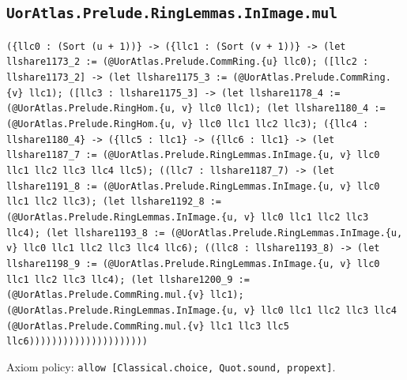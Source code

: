 \documentclass[11pt]{article}
\begin{document}
\subsection*{\texttt{UorAtlas.Prelude.RingLemmas.InImage.mul}}
\noindent\texttt{(\{llc0 : (Sort (u + 1))\} -> (\{llc1 : (Sort (v + 1))\} -> (let llshare1173\_2 := (@UorAtlas.Prelude.CommRing.\{u\} llc0); ([llc2 : llshare1173\_2] -> (let llshare1175\_3 := (@UorAtlas.Prelude.CommRing.\{v\} llc1); ([llc3 : llshare1175\_3] -> (let llshare1178\_4 := (@UorAtlas.Prelude.RingHom.\{u, v\} llc0 llc1); (let llshare1180\_4 := (@UorAtlas.Prelude.RingHom.\{u, v\} llc0 llc1 llc2 llc3); (\{llc4 : llshare1180\_4\} -> (\{llc5 : llc1\} -> (\{llc6 : llc1\} -> (let llshare1187\_7 := (@UorAtlas.Prelude.RingLemmas.InImage.\{u, v\} llc0 llc1 llc2 llc3 llc4 llc5); ((llc7 : llshare1187\_7) -> (let llshare1191\_8 := (@UorAtlas.Prelude.RingLemmas.InImage.\{u, v\} llc0 llc1 llc2 llc3); (let llshare1192\_8 := (@UorAtlas.Prelude.RingLemmas.InImage.\{u, v\} llc0 llc1 llc2 llc3 llc4); (let llshare1193\_8 := (@UorAtlas.Prelude.RingLemmas.InImage.\{u, v\} llc0 llc1 llc2 llc3 llc4 llc6); ((llc8 : llshare1193\_8) -> (let llshare1198\_9 := (@UorAtlas.Prelude.RingLemmas.InImage.\{u, v\} llc0 llc1 llc2 llc3 llc4); (let llshare1200\_9 := (@UorAtlas.Prelude.CommRing.mul.\{v\} llc1); (@UorAtlas.Prelude.RingLemmas.InImage.\{u, v\} llc0 llc1 llc2 llc3 llc4 (@UorAtlas.Prelude.CommRing.mul.\{v\} llc1 llc3 llc5 llc6)))))))))))))))))))))}\par
\noindent Axiom policy: \texttt{allow [Classical.choice, Quot.sound, propext]}.\par
\end{document}
